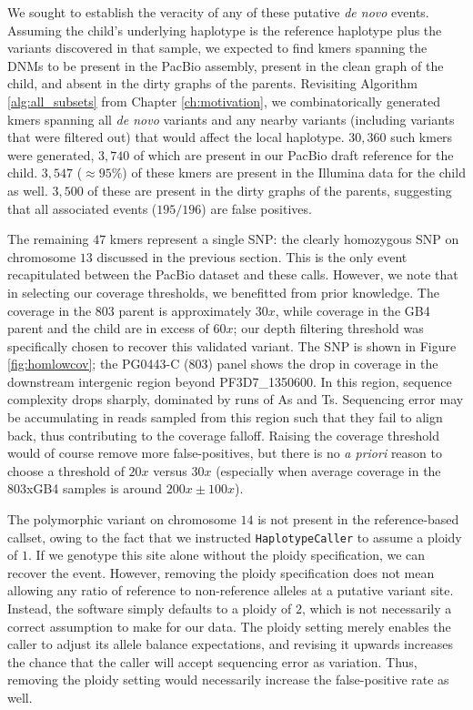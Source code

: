 We sought to establish the veracity of any of these putative \textit{de novo} events.  Assuming the child's underlying haplotype is the reference haplotype plus the variants discovered in that sample, we expected to find kmers spanning the DNMs to be present in the PacBio assembly, present in the clean graph of the child, and absent in the dirty graphs of the parents.  Revisiting Algorithm \ref{alg:all_subsets} from Chapter \ref{ch:motivation}, we combinatorically generated kmers spanning all \textit{de novo} variants and any nearby variants (including variants that were filtered out) that would affect the local haplotype.  $30,360$ such kmers were generated, $3,740$ of which are present in our PacBio draft reference for the child.  $3,547$ ($\approx 95\%$) of these kmers are present in the Illumina data for the child as well.  $3,500$ of these are present in the dirty graphs of the parents, suggesting that all associated events ($195/196$) are false positives.

The remaining $47$ kmers represent a single SNP: the clearly homozygous SNP on chromosome $13$ discussed in the previous section.  This is the only event recapitulated between the PacBio dataset and these calls.  However, we note that in selecting our coverage thresholds, we benefitted from prior knowledge.  The coverage in the 803 parent is approximately $30x$, while coverage in the GB4 parent and the child are in excess of $60x$; our depth filtering threshold was specifically chosen to recover this validated variant.  The SNP is shown in Figure \ref{fig:homlowcov}; the PG0443-C (803) panel shows the drop in coverage in the downstream intergenic region beyond PF3D7\_1350600.  In this region, sequence complexity drops sharply, dominated by runs of As and Ts.  Sequencing error may be accumulating in reads sampled from this region such that they fail to align back, thus contributing to the coverage falloff.  Raising the coverage threshold would of course remove more false-positives, but there is no \textit{a priori} reason to choose a threshold of $20x$ versus $30x$ (especially when average coverage in the 803xGB4 samples is around $200x \pm 100x$).

The polymorphic variant on chromosome $14$ is not present in the reference-based callset, owing to the fact that we instructed \texttt{HaplotypeCaller} to assume a ploidy of $1$.  If we genotype this site alone without the ploidy specification, we can recover the event.  However, removing the ploidy specification does not mean allowing any ratio of reference to non-reference alleles at a putative variant site.  Instead, the software simply defaults to a ploidy of $2$, which is not necessarily a correct assumption to make for our data.  The ploidy setting merely enables the caller to adjust its allele balance expectations, and revising it upwards increases the chance that the caller will accept sequencing error as variation.  Thus, removing the ploidy setting would necessarily increase the false-positive rate as well.

